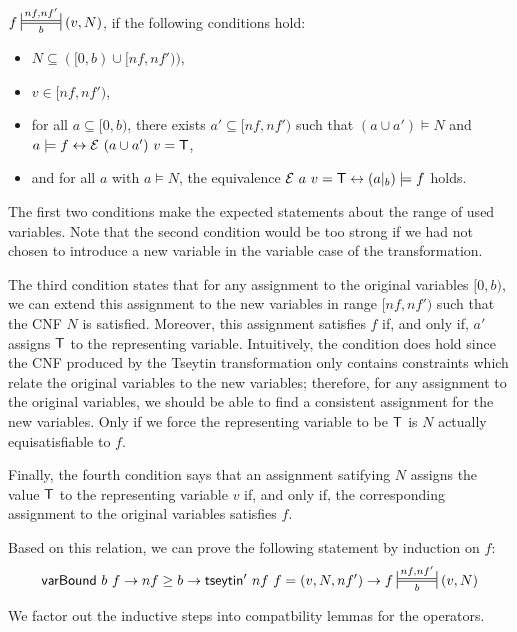 \newcommand{\Frepr}[3]{\sdststile{\ensuremath{#3}}{\ensuremath{#1, #2}}}
\begin{definition}~\\
  $f \Frepr{nf}{nf'}{b} (v, N)$, if the following conditions hold:
  \begin{itemize}
    \item $N \subseteq ([0, b) \cup [nf, nf'))$,
    \item $v \in [nf, nf')$,
    \item for all $a \subseteq [0, b)$, there exists $a' \subseteq [nf, nf')$ such that $(a \cup a') \models N$ and $a \models f \leftrightarrow \mathcal{E}~(a \cup a')~v = \mathsf{T}$,
    \item and for all $a$ with $a \models N$, the equivalence $\mathcal{E}~a~v = \mathsf{T} \leftrightarrow (a |_b) \models f$ holds.
  \end{itemize}
\end{definition}

The first two conditions make the expected statements about the range of used variables. Note that the second condition would be too strong if we had not chosen to introduce a new variable in the variable case of the transformation.

The third condition states that for any assignment to the original variables $[0, b)$, we can extend this assignment to the new variables in range $[nf, nf')$ such that the CNF $N$ is satisfied. Moreover, this assignment satisfies $f$ if, and only if, $a'$ assigns $\mathsf{T}$ to the representing variable.
Intuitively, the condition does hold since the CNF produced by the Tseytin transformation only contains constraints which relate the original variables to the new variables; therefore, for any assignment to the original variables, we should be able to find a consistent assignment for the new variables. Only if we force the representing variable to be $\mathsf{T}$ is $N$ actually equisatisfiable to $f$.

Finally, the fourth condition says that an assignment satifying $N$ assigns the value $\mathsf{T}$ to the representing variable $v$ if, and only if, the corresponding assignment to the original variables satisfies $f$. 

Based on this relation, we can prove the following statement by induction on $f$: 
\[\varBound~b~f \rightarrow nf \ge b \rightarrow \tseytin'~nf~f = (v, N, nf') \rightarrow f \Frepr{nf}{nf'}{b} (v, N) \]

We factor out the inductive steps into compatbility lemmas for the operators. 

